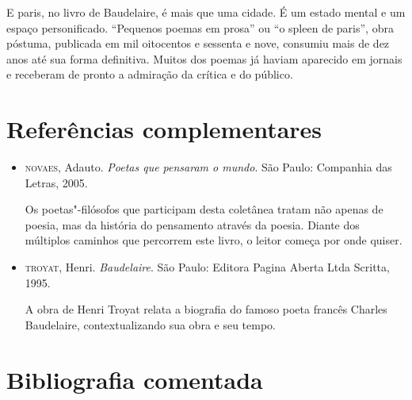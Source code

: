 \documentclass[12pt]{extarticle}
\begin{document}


E paris, no livro de Baudelaire, é mais que uma cidade. É um estado
mental e um espaço personificado.
``Pequenos poemas em prosa'' ou ``o spleen de paris'', obra póstuma,
publicada em mil oitocentos e sessenta e nove, consumiu mais de dez
anos até sua forma definitiva.
Muitos dos poemas já haviam aparecido em jornais e receberam de pronto a
admiração da crítica e do público.

\section{Referências complementares}

\begin{itemize}
\item\textsc{novaes}, Adauto. \textit{Poetas que pensaram o mundo}. São Paulo:
Companhia das Letras, 2005.

Os poetas"-filósofos que participam desta coletânea tratam não apenas de
poesia, mas da história do pensamento através da poesia. Diante dos
múltiplos caminhos que percorrem este livro, o leitor começa por onde
quiser.

\item\textsc{troyat}, Henri. \textit{Baudelaire}. São Paulo: Editora Pagina Aberta Ltda Scritta, 1995.

A obra de Henri Troyat relata a biografia do famoso poeta francês
Charles Baudelaire, contextualizando sua obra e seu tempo.
\end{itemize}

\section{Bibliografia comentada}
\end{document}
